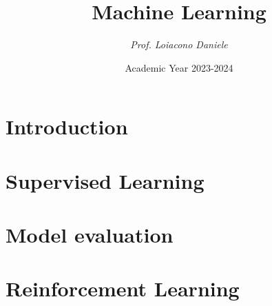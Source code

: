 \documentclass[12pt, a4paper]{report}
\title{\textbf{Machine Learning}}
\author{\textit{Prof. Loiacono Daniele}}
\date{Academic Year 2023-2024}
\begin{document}
    \maketitle

    

    \cleardoublepage{}

    \tableofcontents

    \cleardoublepage{}

    \chapter{Introduction}
    
    
    
    

    \chapter{Supervised Learning}
    
    
    
    

    \chapter{Model evaluation}
    
    
    
    
    

    \chapter{Reinforcement Learning}
    
    
    
    
    
\end{document}
